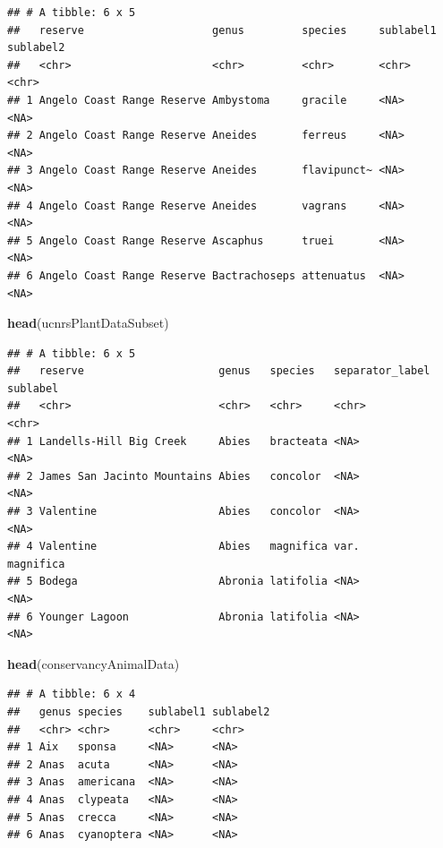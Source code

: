 \documentclass[]{article}
\newenvironment{Shaded}{\begin{snugshade}}{\end{snugshade}}
\newcommand{\KeywordTok}[1]{\textcolor[rgb]{0.13,0.29,0.53}{\textbf{#1}}}
\newcommand{\NormalTok}[1]{#1}
\begin{document}
\begin{verbatim}
## # A tibble: 6 x 5
##   reserve                    genus         species     sublabel1 sublabel2
##   <chr>                      <chr>         <chr>       <chr>     <chr>    
## 1 Angelo Coast Range Reserve Ambystoma     gracile     <NA>      <NA>     
## 2 Angelo Coast Range Reserve Aneides       ferreus     <NA>      <NA>     
## 3 Angelo Coast Range Reserve Aneides       flavipunct~ <NA>      <NA>     
## 4 Angelo Coast Range Reserve Aneides       vagrans     <NA>      <NA>     
## 5 Angelo Coast Range Reserve Ascaphus      truei       <NA>      <NA>     
## 6 Angelo Coast Range Reserve Bactrachoseps attenuatus  <NA>      <NA>
\end{verbatim}

\begin{Shaded}
\begin{Highlighting}[]
\KeywordTok{head}\NormalTok{(ucnrsPlantDataSubset)}
\end{Highlighting}
\end{Shaded}

\begin{verbatim}
## # A tibble: 6 x 5
##   reserve                     genus   species   separator_label sublabel 
##   <chr>                       <chr>   <chr>     <chr>           <chr>    
## 1 Landells-Hill Big Creek     Abies   bracteata <NA>            <NA>     
## 2 James San Jacinto Mountains Abies   concolor  <NA>            <NA>     
## 3 Valentine                   Abies   concolor  <NA>            <NA>     
## 4 Valentine                   Abies   magnifica var.            magnifica
## 5 Bodega                      Abronia latifolia <NA>            <NA>     
## 6 Younger Lagoon              Abronia latifolia <NA>            <NA>
\end{verbatim}

\begin{Shaded}
\begin{Highlighting}[]
\KeywordTok{head}\NormalTok{(conservancyAnimalData)}
\end{Highlighting}
\end{Shaded}

\begin{verbatim}
## # A tibble: 6 x 4
##   genus species    sublabel1 sublabel2
##   <chr> <chr>      <chr>     <chr>    
## 1 Aix   sponsa     <NA>      <NA>     
## 2 Anas  acuta      <NA>      <NA>     
## 3 Anas  americana  <NA>      <NA>     
## 4 Anas  clypeata   <NA>      <NA>     
## 5 Anas  crecca     <NA>      <NA>     
## 6 Anas  cyanoptera <NA>      <NA>
\end{verbatim}
\end{document}
